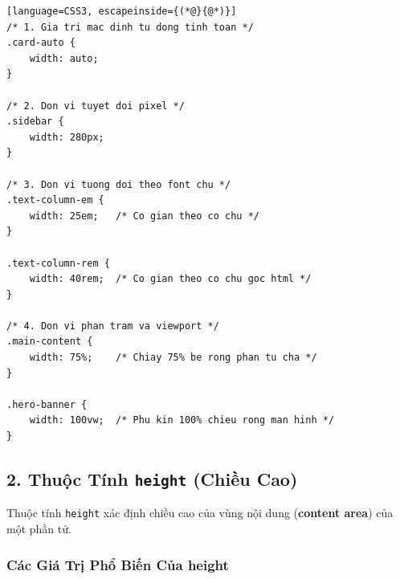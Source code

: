 \documentclass[11pt,oneside]{book}
\newcommand{\codeinline}[1]{\textcolor{accentOrange}{\texttt{#1}}}
\newcommand{\term}[1]{\textbf{\textcolor{primaryBlue}{#1}}}
\DeclareRobustCommand{\csshint}[1]{\texorpdfstring{\textcolor{accentOrange}{\textbf{\texttt{#1}}}}{#1}}
\begin{document}
\begin{codeWindow}
\begin{lstlisting}[language=CSS3, escapeinside={(*@}{@*)}]
/* 1. Gia tri mac dinh tu dong tinh toan */
.card-auto {
    width: auto;
}

/* 2. Don vi tuyet doi pixel */
.sidebar {
    width: 280px;
}

/* 3. Don vi tuong doi theo font chu */
.text-column-em {
    width: 25em;   /* Co gian theo co chu */
}

.text-column-rem {
    width: 40rem;  /* Co gian theo co chu goc html */
}

/* 4. Don vi phan tram va viewport */
.main-content {
    width: 75%;    /* Chiay 75% be rong phan tu cha */
}

.hero-banner {
    width: 100vw;  /* Phu kin 100% chieu rong man hinh */
}
\end{lstlisting}
\end{codeWindow}

\subsection{2. Thuộc Tính \csshint{height} (Chiều Cao)}
\label{subsec:property_height}

Thuộc tính \codeinline{height} xác định chiều cao của vùng nội dung (\term{content area}) của một phần tử.

\subsubsection{Các Giá Trị Phổ Biến Của height}
\end{document}
